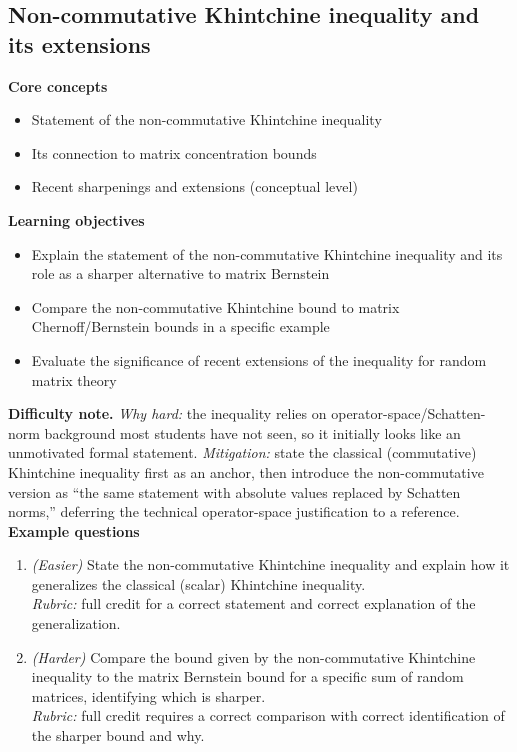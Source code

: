 \documentclass[11pt]{article}
\begin{document}
\subsection{Non-commutative Khintchine inequality and its extensions}
\textbf{Core concepts}
\begin{itemize}[nosep]
\item Statement of the non-commutative Khintchine inequality
\item Its connection to matrix concentration bounds
\item Recent sharpenings and extensions (conceptual level)
\end{itemize}
\textbf{Learning objectives}
\begin{itemize}[nosep]
\item Explain the statement of the non-commutative Khintchine inequality and its role as a sharper alternative to matrix Bernstein
\item Compare the non-commutative Khintchine bound to matrix Chernoff/Bernstein bounds in a specific example
\item Evaluate the significance of recent extensions of the inequality for random matrix theory
\end{itemize}
\textbf{Difficulty note.} \emph{Why hard:} the inequality relies on operator-space/Schatten-norm background most students have not seen, so it initially looks like an unmotivated formal statement. \emph{Mitigation:} state the classical (commutative) Khintchine inequality first as an anchor, then introduce the non-commutative version as ``the same statement with absolute values replaced by Schatten norms,'' deferring the technical operator-space justification to a reference.\\[4pt]
\textbf{Example questions}
\begin{enumerate}[nosep]
\item \emph{(Easier)} State the non-commutative Khintchine inequality and explain how it generalizes the classical (scalar) Khintchine inequality. \\
\emph{Rubric:} full credit for a correct statement and correct explanation of the generalization.
\item \emph{(Harder)} Compare the bound given by the non-commutative Khintchine inequality to the matrix Bernstein bound for a specific sum of random matrices, identifying which is sharper. \\
\emph{Rubric:} full credit requires a correct comparison with correct identification of the sharper bound and why.
\end{enumerate}
\end{document}
